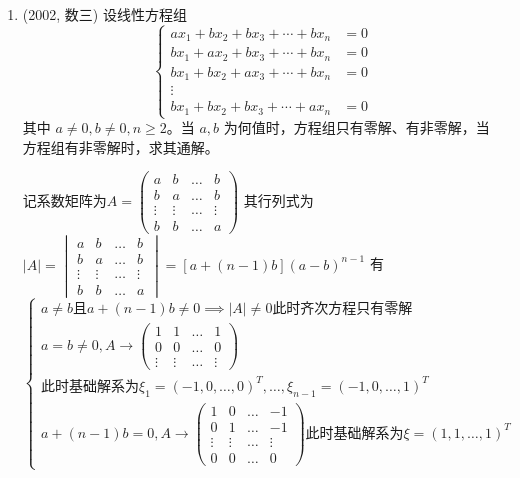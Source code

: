 \documentclass[12pt, a4paper, oneside, UTF8]{ctexbook}
\begin{document}
\begin{enumerate}
    \item (2002, 数三) 设线性方程组
    \[
    \begin{cases}
    a x_1 + b x_2 + b x_3 + \cdots + b x_n &= 0 \\
    b x_1 + a x_2 + b x_3 + \cdots + b x_n &= 0 \\
    b x_1 + b x_2 + a x_3 + \cdots + b x_n &= 0 \\
    \vdots \\
    b x_1 + b x_2 + b x_3 + \cdots + a x_n &= 0
    \end{cases}
    \]
    其中 $a \neq 0, b \neq 0, n \geq 2$。当 $a, b$ 为何值时，方程组只有零解、有非零解，当方程组有非零解时，求其通解。
    
    \begin{solution}
    记系数矩阵为$A=\begin{pmatrix}
        a & b & \ldots & b \\
        b & a & \ldots & b \\
        \vdots & \vdots & \ldots & \vdots \\
        b & b & \ldots & a
    \end{pmatrix}$ 其行列式为$\left|A\right|=\begin{vmatrix}
        a & b & \ldots & b \\
        b & a & \ldots & b \\
        \vdots & \vdots & \ldots & \vdots \\
        b & b & \ldots & a
    \end{vmatrix}=[a+(n-1)b](a-b)^{n-1}$ 有
    $$
    \begin{cases}
        a\neq b \text{且} a+(n-1)b\neq 0 \implies \left|A\right|\neq 0 \text{此时齐次方程只有零解} \\
        a=b\neq 0, A\rightarrow \begin{pmatrix}
            1 & 1 & \ldots & 1 \\
            0 & 0 & \ldots & 0 \\
            \vdots & \vdots & \ldots & \vdots 
        \end{pmatrix} \\
        \text{此时基础解系为} \xi_1=(-1,0,\ldots,0)^T,\ldots,\xi_{n-1}=(-1,0,\ldots,1)^T \\
        a+(n-1)b=0, A\rightarrow \begin{pmatrix}
            1 & 0 & \ldots & -1 \\
            0 & 1 & \ldots & -1 \\
            \vdots & \vdots & \ldots & \vdots  \\
            0 & 0 & \ldots & 0
        \end{pmatrix} \text{此时基础解系为} \xi=(1,1,\ldots,1)^T
    \end{cases}
    $$
    \end{solution}
\end{enumerate}
\end{document}
